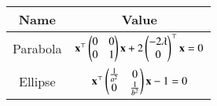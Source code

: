 \begin{tabular}{|c|c|}
\hline
\textbf{Name} & \textbf{Value} \\
\hline
Parabola & $\mathbf{x}^\top \begin{pmatrix}0 & 0 \\ 0 & 1\end{pmatrix} \mathbf{x} + 2 \begin{pmatrix}-2\lambda \\ 0\end{pmatrix}^\top \mathbf{x} = 0$ \\
\hline
Ellipse & $\mathbf{x}^\top \begin{pmatrix}\tfrac{1}{a^2} & 0 \\ 0 & \tfrac{1}{b^2}\end{pmatrix} \mathbf{x} - 1 = 0$ \\
\hline
\end{tabular}
